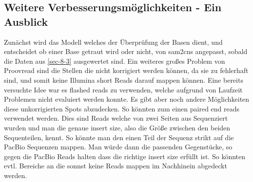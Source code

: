 \documentclass{scrartcl}
\begin{document}
\subsection{Weitere Verbesserungsmöglichkeiten - Ein Ausblick}
\label{sec-9-2}
Zunächst wird das Modell welches der Überprüfung der Basen dient, und entscheidet ob einer Base getraut wird oder nicht, von sam2cns angepasst, 
sobald die Daten aus \ref{sec-8-3} ausgewertet sind. 
Ein weiteres großes Problem von Proovread sind die Stellen die nicht korrigiert werden können, da sie zu fehlerhaft sind, und somit keine Illumina
short Reads darauf mappen können. Eine bereits versuchte Idee war es flashed reads zu verwenden, welche aufgrund von Laufzeit Problemen nicht
evaluiert werden konnte. Es gibt aber noch andere Möglichkeiten diese unkorrigierten Spots abzudecken. So könnten zum einen paired end reads verwendet werden.
Dies sind Reads welche von zwei Seiten aus Sequenziert wurden und man die genaue insert size, also die Größe zwischen den beiden Sequenteilen, kennt.
So könnte man den einen Teil der Sequenz strikt auf die PacBio Sequenzen mappen. Man würde dann die passenden Gegenstücke, so gegen die PacBio Reads halten
dass die richtige insert size erfüllt ist. So könnten evtl. Bereiche an die sonnst keine Reads mappen im Nachhinein abgedeckt werden.



\clearpage
\end{document}
